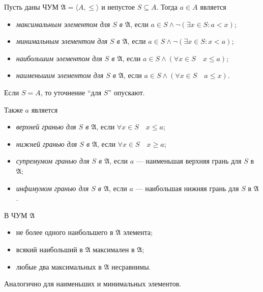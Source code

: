 \documentclass[12pt,a4paper]{article}
\begin{document}
    \begin{definition}
        Пусть даны ЧУМ $\mathfrak{A} = \langle A, \leqslant \rangle$ и непустое $S \subseteq A$. Тогда $a \in A$ является
        \begin{itemize}
            \item \emph{максимальным элементом для $S$ в $\mathfrak{A}$}, если $a \in S \wedge \neg(\exists x \in S: a < x)$;
            \item \emph{минимальным элементом для $S$ в $\mathfrak{A}$}, если $a \in S \wedge \neg(\exists x \in S: x < a)$;
            \item \emph{наибольшим элементом для $S$ в $\mathfrak{A}$}, если $a \in S \wedge (\forall x \in S\quad x \leqslant a)$;
            \item \emph{наименьшим элементом для $S$ в $\mathfrak{A}$}, если $a \in S \wedge (\forall x \in S\quad a \leqslant x)$.
        \end{itemize}

        Если $S = A$, то уточнение ``для $S$'' опускают.

        Также $a$ является
        \begin{itemize}
            \item \emph{верхней гранью для $S$ в $\mathfrak{A}$}, если $\forall x \in S\quad x \leqslant a$;
            \item \emph{нижней гранью для $S$ в $\mathfrak{A}$}, если $\forall x \in S\quad x \geqslant a$;
            \item \emph{супремумом гранью для $S$ в $\mathfrak{A}$}, если $a$ --- наименьшая верхняя грань для $S$ в $\mathfrak{A}$;
            \item \emph{инфимумом гранью для $S$ в $\mathfrak{A}$}, если $a$ --- наибольшая нижняя грань для $S$ в $\mathfrak{A}$.
        \end{itemize}
    \end{definition}

    \begin{statement}
        В ЧУМ $\mathfrak{A}$
        \begin{itemize}
            \item не более одного наибольшего в $\mathfrak{A}$ элемента;
            \item всякий наибольший в $\mathfrak{A}$ максимален в $\mathfrak{A}$;
            \item любые два максимальных в $\mathfrak{A}$ несравнимы.
        \end{itemize}

        Аналогично для наименьших и минимальных элементов.
    \end{statement}
\end{document}
